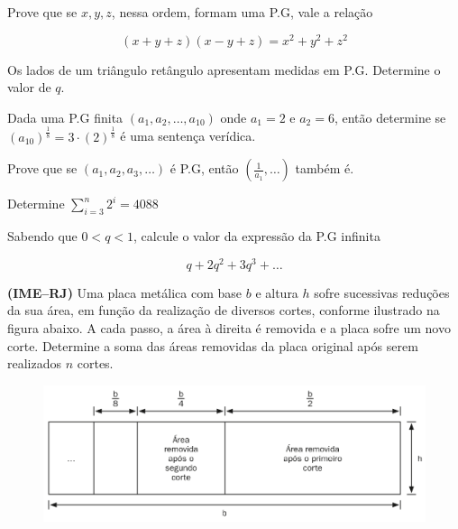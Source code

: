 \begin{questions}

  \question Prove que se $x, y, z$, nessa ordem, formam uma P.G, vale a relação

  \[(x + y + z)(x - y + z) = x^{2} + y^{2} + z^{2}\]

  \vspace{0.5cm}

  \question Os lados de um triângulo retângulo apresentam medidas em P.G. Determine o valor de $q$.

  \vspace{0.5cm}

  \question Dada uma P.G finita $(a_{1}, a_{2}, \dots, a_{10})$ onde $a_{1} = 2$ e $a_{2} = 6$, então determine se $(a_{10})^{\frac{1}{8}} = 3\cdot (2)^{\frac{1}{8}}$ é uma sentença verídica.

  \vspace{0.5cm}

  \question Prove que se $(a_{1}, a_{2}, a_{3}, \dots)$ é P.G, então $\displaystyle \left(\frac{1}{a_{1}}, \dots\right)$ também é.

  \vspace{0.5cm}

  \question Determine $\displaystyle \sum_{i = 3}^{n} 2^{i} = 4088$

  \vspace{0.5cm}

  \question Sabendo que $0 < q < 1$, calcule o valor da expressão da P.G infinita

  \[q + 2q^{2} + 3q^{3} + \dots\]

  \question \textbf{(IME–RJ)} Uma placa metálica com base $b$ e altura $h$ sofre sucessivas reduções da sua área, em função da realização de diversos cortes, conforme ilustrado na figura abaixo. A cada passo, a área à direita é removida e a placa sofre um novo corte. Determine a soma das áreas removidas da placa original após serem realizados $n$ cortes.

  \begin{center}
  \begin{figure}[ht]
    \includegraphics[width=12cm]{contents/ime-questao6}
    \centering
  \end{figure}
  \end{center}


\end{questions}
